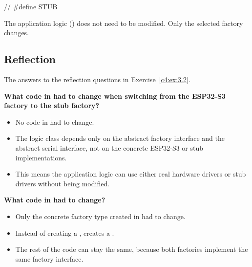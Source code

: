\begin{cppcode}
// #define STUB
\end{cppcode}

\noindent The application logic () does not need to be modified. Only the
selected factory changes.

\subsection{Reflection}
\label{sol:c4:reflection}
The answers to the reflection questions in Exercise~\ref{c4:ex:3.2}.

\textbf{What code in  had to change when switching from the ESP32-S3 factory to the stub
factory?}
\begin{itemize}
  \item No code in  had to change.
  \item The logic class depends only on the abstract factory interface and the abstract serial
    interface, not on the concrete ESP32-S3 or stub implementations.
  \item This means the application logic can use either real hardware drivers or stub drivers
    without being modified.
\end{itemize}

\textbf{What code in  had to change?}
\begin{itemize}
  \item Only the concrete factory type created in  had to change.
  \item Instead of creating a ,  creates a
    .
  \item The rest of the code can stay the same, because both factories implement the same factory
    interface.
\end{itemize}
